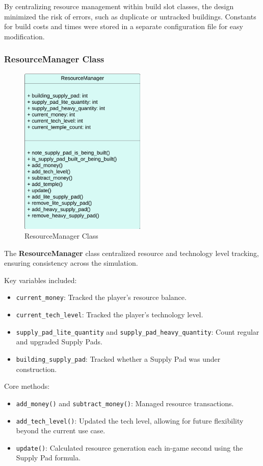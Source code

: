 \documentclass[a4paper, 12pt, english]{article}
\begin{document}
By centralizing resource management within build slot classes, the design minimized the risk of errors, such as duplicate or untracked buildings. Constants for build costs and times were stored in a separate configuration file for easy modification.

\subsubsection{ResourceManager Class}
\begin{figure}[!ht]
    \begin{center}
        \includegraphics[width=60mm,scale=1.0]{HaloWarsDiagramResourceManager.png}
    \end{center}
    \caption{\label{fig:ResourceManagerClass}ResourceManager Class}
\end{figure}

The \textbf{ResourceManager} class centralized resource and technology level tracking, ensuring consistency across the simulation.  

Key variables included:
\begin{itemize}
    \item \texttt{current\_money}: Tracked the player’s resource balance.
    \item \texttt{current\_tech\_level}: Tracked the player’s technology level.
    \item \texttt{supply\_pad\_lite\_quantity} and \texttt{supply\_pad\_heavy\_quantity}: Count regular and upgraded Supply Pads.
    \item \texttt{building\_supply\_pad}: Tracked whether a Supply Pad was under construction.
\end{itemize}

Core methods:
\begin{itemize}
    \item \texttt{add\_money()} and \texttt{subtract\_money()}: Managed resource transactions.
    \item \texttt{add\_tech\_level()}: Updated the tech level, allowing for future flexibility beyond the current use case.
    \item \texttt{update()}: Calculated resource generation each in-game second using the Supply Pad formula.
\end{itemize}
\end{document}
